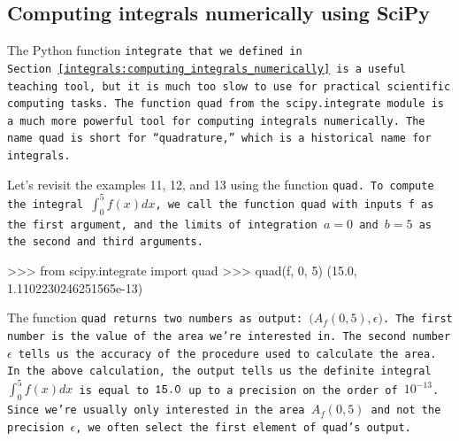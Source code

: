


	\subsection{Computing integrals numerically using SciPy}
	\label{integrals:scipy}

		The Python function \tt{integrate}
		that we defined in Section~\ref{integrals:computing_integrals_numerically}
		is a useful teaching tool,
		but it is much too slow to use for practical scientific computing tasks.
		The function \tt{quad} from the \tt{scipy.integrate} module
		is a much more powerful tool for computing integrals numerically.
		The name \tt{quad} is short for ``quadrature,''
		which is a historical name for integrals.

		Let's revisit the examples 11, 12, and 13 using the function \tt{quad}.
		To compute the integral $\int_0^5 f(x) dx$,
		we call the function \tt{quad} with inputs \tt{f} as the first argument,
		and the limits of integration $a=0$ and $b=5$ as the second and third arguments.

		\begin{codeblock}
		>>> from scipy.integrate import quad
		>>> quad(f, 0, 5)
		(15.0, 1.1102230246251565e-13)
		\end{codeblock}

		\noindent
		The function \tt{quad} returns two numbers as output: $\big(A_f(0,5),\epsilon\big)$.
		The first number is the value of the area we're interested in.
		The second number $\epsilon$ tells us the accuracy of the procedure used to calculate the area.
		In the above calculation,
		the output tells us the definite integral $\int_0^5 f(x) dx$ is equal to $\tt{15.0}$
		up to a precision on the order of $10^{-13}$.
		Since we're usually only interested in the area $A_f(0,5)$
		and not the precision $\epsilon$,
		we often select the first element of \tt{quad}'s output.

